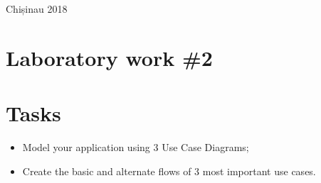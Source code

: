 \documentclass[12pt,a4paper,titlepage]{article}
\begin{document}
\begin{titlepage}
\begin{center}
      \vspace{5 mm}


      {\large Chișinau 2018}\\[3cm] %




      \vfill %
      \end{center}
      
\end{titlepage}

\cleardoublepage

\newpage

\setcounter{page}{1}
\setcounter{secnumdepth}{4}

\cleardoublepage


{}
\section*{Laboratory work \#2}

\section{Tasks}
\begin{itemize}
	\item
	Model your application using 3 Use Case Diagrams;
	\item 
	Create the basic and alternate flows of 3 most important use cases.
\end{itemize}
\end{document}
